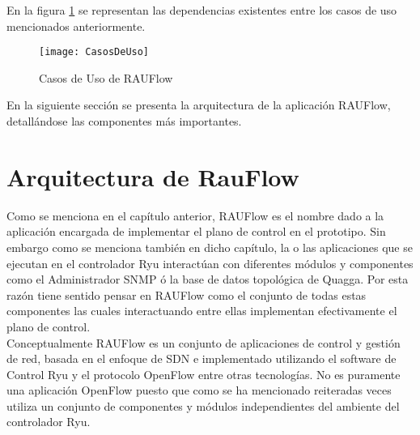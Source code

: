 En la figura \ref{fig:CasosDeUso} se representan las dependencias existentes entre los casos de uso mencionados anteriormente.\\

\begin{figure}[ht!] 
\centering    
\texttt{[image: CasosDeUso]}
\caption[Casos de Uso de RAUFlow]{Casos de Uso de RAUFlow}
\label{fig:CasosDeUso}
\end{figure}

En la siguiente secci\'on se presenta la arquitectura de la aplicaci\'on RAUFlow, detallándose las componentes m\'as importantes.


\section[Arquitectura de RauFlow]{Arquitectura de RauFlow}


Como se menciona en el cap\'itulo anterior, RAUFlow es el nombre dado a la aplicaci\'on encargada de implementar el plano de control en el prototipo. Sin embargo como se menciona tambi\'en en dicho cap\'itulo, la o las aplicaciones que se ejecutan en el controlador Ryu interact\'uan con diferentes m\'odulos y componentes como el Administrador SNMP \'o la base de datos topol\'ogica de Quagga. Por esta raz\'on tiene sentido pensar en RAUFlow como el conjunto de todas estas componentes las cuales interactuando entre ellas implementan efectivamente el plano de control.\\

Conceptualmente RAUFlow es un conjunto de aplicaciones de control y gestión de red, basada en el enfoque de SDN e implementado utilizando el software de Control Ryu y el protocolo OpenFlow entre otras tecnologías. No es puramente una aplicaci\'on OpenFlow puesto que como se ha mencionado reiteradas veces utiliza un conjunto de componentes y m\'odulos independientes del ambiente del controlador Ryu.

